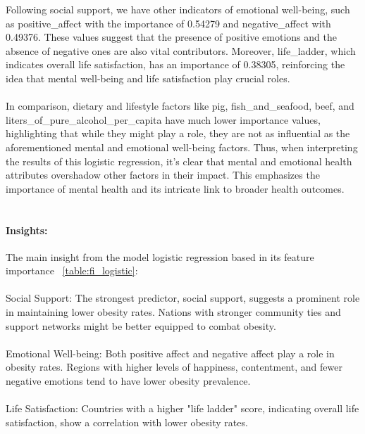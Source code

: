 		Following social support, we have other indicators of emotional well-being, such as positive\_affect with the
		importance of 0.54279 and negative\_affect with 0.49376. These values suggest that the presence of positive
		emotions and the absence of negative ones are also vital contributors. Moreover, life\_ladder, which indicates
		overall life satisfaction, has an importance of 0.38305, reinforcing the idea that mental well-being and life
		satisfaction play crucial roles.
		\\
		\\
		In comparison, dietary and lifestyle factors like pig, fish\_and\_seafood, beef, and
		liters\_of\_pure\_alcohol\_per\_capita have much lower importance values, highlighting that while they might
		play a role, they are not as influential as the aforementioned mental and emotional well-being factors.
		Thus, when interpreting the results of this logistic regression, it's clear that mental and emotional health
		attributes overshadow other factors in their impact. This emphasizes the importance of mental health and its
		intricate link to broader health outcomes.
		\\
		\\

		\paragraph{Insights:}
			The main insight from the model logistic regression based in its feature importance
			~\ref{table:fi_logistic}:
			\\
			\\
			Social Support: The strongest predictor, social support, suggests a prominent role in maintaining lower
			obesity rates. Nations with stronger community ties and support networks might be better equipped to combat
			obesity.
			\\
			\\
			Emotional Well-being: Both positive affect and negative affect play a role in obesity rates. Regions with
			higher levels of happiness, contentment, and fewer negative emotions tend to have lower obesity prevalence.
			\\
			\\
			Life Satisfaction: Countries with a higher "life ladder" score, indicating overall life satisfaction,
			show a correlation with lower obesity rates.
			\\
			\\

